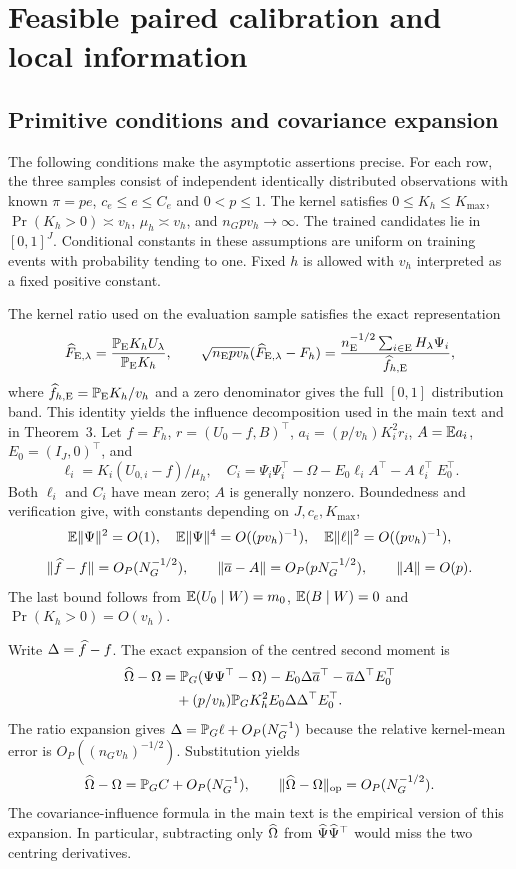 \section{Feasible paired calibration and local information}
\subsection{Primitive conditions and covariance expansion}
The following conditions make the asymptotic assertions precise. For each row, the three samples consist of independent identically distributed observations with known $\pi=pe$, $c_e\leq e\leq C_e$ and $0<p\leq1$. The kernel satisfies $0\leq K_h\leq K_{\max}$, $\Pr(K_h>0)\asymp v_h$, $\mu_h\asymp v_h$, and $n_Gpv_h\to\infty$. The trained candidates lie in $[0,1]^J$. Conditional constants in these assumptions are uniform on training events with probability tending to one. Fixed $h$ is allowed with $v_h$ interpreted as a fixed positive constant.

The kernel ratio used on the evaluation sample satisfies the exact representation
\begin{equation}\label{eq:identity}
 \widehat F_{\mathrm{E},\lambda}=\frac{\mathbb P_{\mathrm{E}}K_hU_\lambda}{\mathbb P_{\mathrm{E}}K_h},\qquad
 \sqrt{n_{\mathrm{E}}pv_h}(\widehat F_{\mathrm{E},\lambda}-F_h)
 =\frac{n_{\mathrm{E}}^{-1/2}\sum_{i\in\mathrm{E}}H_\lambda\Psi_i}{\widehat f_{h,\mathrm{E}}},
\end{equation}
where $\widehat f_{h,\mathrm{E}}=\mathbb P_{\mathrm{E}}K_h/v_h$ and a zero denominator gives the full $[0,1]$ distribution band. This identity yields the influence decomposition used in the main text and in Theorem~3.
Let $f=F_h$, $r=(U_0-f,B)^\top$, $a_i=(p/v_h)K_i^2r_i$, $A=\mathbb E a_i$, $E_0=(I_J,0)^\top$, and
\[
 \ell_i=K_i(U_{0,i}-f)/\mu_h,
 \quad C_i=\Psi_i\Psi_i^\top-\Omega
       -E_0\ell_iA^\top-A\ell_i^\top E_0^\top.
\]
Both $\ell_i$ and $C_i$ have mean zero; $A$ is generally nonzero. Boundedness and verification give, with constants depending on $J,c_e,K_{\max}$,
\[
 \mathbb E\|\Psi\|^2=O(1),\quad
 \mathbb E\|\Psi\|^4=O((pv_h)^{-1}),\quad
 \mathbb E\|\ell\|^2=O((pv_h)^{-1}),
\]
\[
 \|\widehat f-f\|=O_P(N_G^{-1/2}),\qquad
 \|\overline a-A\|=O_P(pN_G^{-1/2}),\qquad \|A\|=O(p).
\]
The last bound follows from $\mathbb E(U_0\mid W)=m_0$, $\mathbb E(B\mid W)=0$ and $\Pr(K_h>0)=O(v_h)$.

Write $\Delta=\widehat f-f$. The exact expansion of the centred second moment is
\begin{align}
 \widehat\Omega-\Omega
 &=\mathbb P_G(\Psi\Psi^\top-\Omega)
   -E_0\Delta\overline a^\top-\overline a\Delta^\top E_0^\top\notag\\
 &\quad +(p/v_h)\mathbb P_G K_h^2 E_0\Delta\Delta^\top E_0^\top.
\end{align}
The ratio expansion gives $\Delta=\mathbb P_G\ell+O_P(N_G^{-1})$ because the relative kernel-mean error is $O_P((n_Gv_h)^{-1/2})$. Substitution yields
\begin{equation}\label{eq:covexpansion}
 \widehat\Omega-\Omega=\mathbb P_G C+O_P(N_G^{-1}),\qquad
 \|\widehat\Omega-\Omega\|_{\mathrm{op}}=O_P(N_G^{-1/2}).
\end{equation}
The covariance-influence formula in the main text is the empirical version of this expansion. In particular, subtracting only $\widehat\Omega$ from $\widehat\Psi\widehat\Psi^\top$ would miss the two centring derivatives.

